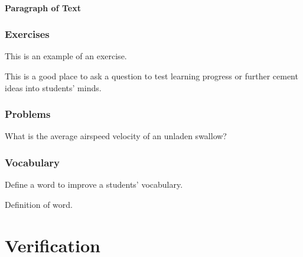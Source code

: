 \documentclass[11pt,fleqn,,a4paper,twoside,openright]{book} %
\begin{document}
\subsection{Paragraph of Text}

\begin{example}
\lipsum[2]
\end{example}


\section{Exercises}

This is an example of an exercise.

\begin{exercise}
This is a good place to ask a question to test learning progress or further cement ideas into students' minds.
\end{exercise}


\section{Problems}

\begin{problem}
What is the average airspeed velocity of an unladen swallow?
\end{problem}


\section{Vocabulary}

Define a word to improve a students' vocabulary.

\begin{vocabulary}[Word]
Definition of word.
\end{vocabulary}


\part{Verification}
\end{document}
